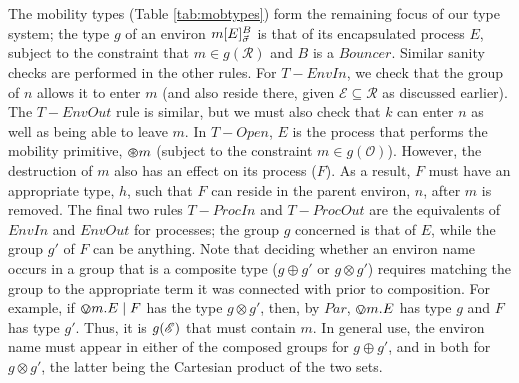 The mobility types (Table \ref{tab:mobtypes}) form the remaining focus
of our type system; the type $g$ of an environ
${m}[ E ]^{B}_{\vec{\sigma}}$ is that of its encapsulated process
$E$, subject to the constraint that $m \in g(\mathscr{R})$ and $B$ is
a $Bouncer$. Similar sanity checks are performed in the other
rules. For $T-EnvIn$, we check that the group of $n$ allows it to enter
$m$ (and also reside there, given $\mathscr{E} \subseteq \mathscr{R}$
as discussed earlier).  The $T-EnvOut$ rule is similar, but we must also
check that $k$ can enter $n$ as well as being able to leave $m$.  In
$T-Open$, $E$ is the process that performs the mobility primitive,
$\varoast m$ (subject to the constraint $m \in g(\mathscr{O})$).
However, the destruction of $m$ also has an effect on its process
($F$).  As a result, $F$ must have an appropriate type, $h$, such that
$F$ can reside in the parent environ, $n$, after $m$ is removed.  The
final two rules $T-ProcIn$ and $T-ProcOut$ are the equivalents of $EnvIn$
and $EnvOut$ for processes; the group $g$ concerned is that of $E$,
while the group $g'$ of $F$ can be anything.  Note that deciding
whether an environ name occurs in a group that is a composite type ($g
\oplus g'$ or $g \otimes g'$) requires matching the group to the
appropriate term it was connected with prior to composition.  For
example, if $\varovee m.E \;|\; F$ has the type $g \otimes g'$, then, by
$Par$, $\varovee m.E$ has type $g$ and $F$ has type $g'$.  Thus, it is
$g(\mathscr{E})$ that must contain $m$.  In general use, the environ name
must appear in either of the composed groups for $g \oplus g'$, and in
both for $g \otimes g'$, the latter being the Cartesian product of the
two sets.

